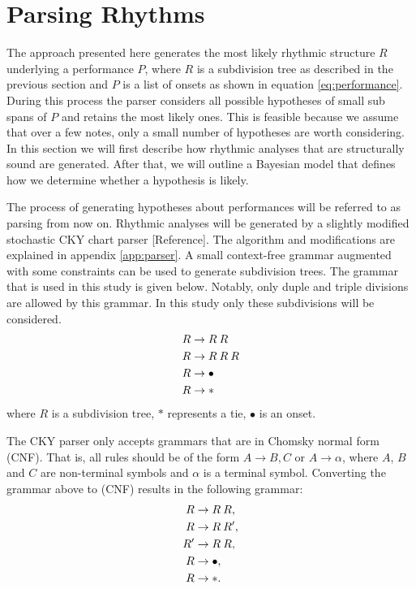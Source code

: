 \section{Parsing Rhythms}

The approach presented here generates the most likely rhythmic structure $R$ underlying a performance $P$, where $R$ is a subdivision tree as described in the previous section and $P$ is a list of onsets as shown in equation \ref{eq:performance}. During this process the parser considers all possible hypotheses of small sub spans of $P$ and retains the most likely ones. This is feasible because we assume that over a few notes, only a small number of hypotheses are worth considering. In this section we will first describe how rhythmic analyses that are structurally sound are generated. After that, we will outline a Bayesian model that defines how we determine whether a hypothesis is likely.

The process of generating hypotheses about performances will be referred to as parsing from now on. Rhythmic analyses will be generated by a slightly modified stochastic CKY chart parser [Reference]. The algorithm and modifications are explained in appendix \ref{app:parser}. A small context-free grammar augmented with some constraints can be used to generate subdivision trees. The grammar that is used in this study is given below.  Notably, only duple and triple divisions are allowed by this grammar. In this study only these subdivisions will be considered.
\begin{align}
R &\rightarrow R\: R\\ \notag
R &\rightarrow R\: R\: R\\ \notag
R &\rightarrow \bullet\\ \notag
R &\rightarrow * \notag
\end{align}
where $R$ is a subdivision tree, $*$ represents a tie, $\bullet$ is an onset. 

The CKY parser only accepts grammars that are in Chomsky normal form (CNF). That is, all rules should be of the form $A \rightarrow B, C$ or $A \rightarrow \alpha$, where $A$, $B$ and $C$ are non-terminal symbols and $\alpha$ is a terminal symbol. Converting the grammar above to (CNF) results in the following grammar:
\begin{align}
\label{eq:grammar_cnf}
R &\rightarrow R\: R,\\ \notag
R &\rightarrow R\: R',\\ \notag
R' &\rightarrow R\: R,\\ \notag
R &\rightarrow \bullet,\\ \notag
R &\rightarrow *. \notag
\end{align}

